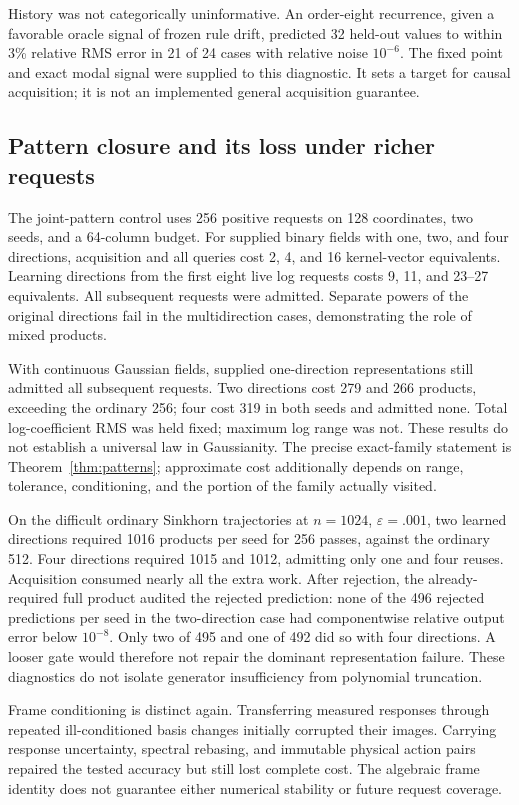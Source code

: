 \documentclass[journal]{IEEEtran}
\theoremstyle{definition}
\begin{document}
History was not categorically uninformative. An order-eight recurrence,
given a favorable oracle signal of frozen rule drift, predicted 32 held-out
values to within 3\% relative RMS error in 21 of 24 cases with relative
noise $10^{-6}$. The fixed point and exact modal signal were supplied to
this diagnostic. It sets a target for causal acquisition; it is not an
implemented general acquisition guarantee.

\subsection{Pattern closure and its loss under richer requests}
The joint-pattern control uses 256 positive requests on 128 coordinates,
two seeds, and a 64-column budget. For supplied binary fields with one,
two, and four directions, acquisition and all queries cost 2, 4, and 16
kernel-vector equivalents. Learning directions from the first eight live
log requests costs 9, 11, and 23--27 equivalents. All subsequent requests
were admitted. Separate powers of the original directions fail in the
multidirection cases, demonstrating the role of mixed products.

With continuous Gaussian fields, supplied one-direction representations
still admitted all subsequent requests. Two directions cost 279 and 266
products, exceeding the ordinary 256; four cost 319 in both seeds and
admitted none. Total log-coefficient RMS was held fixed; maximum log range
was not. These results do not establish a universal law in Gaussianity.
The precise exact-family statement is Theorem~\ref{thm:patterns};
approximate cost additionally depends on range, tolerance, conditioning,
and the portion of the family actually visited.

On the difficult ordinary Sinkhorn trajectories at $n=1024$,
$\varepsilon=.001$, two learned directions required 1016 products per
seed for 256 passes, against the ordinary 512. Four directions required
1015 and 1012, admitting only one and four reuses. Acquisition consumed
nearly all the extra work. After rejection, the already-required full
product audited the rejected prediction: none of the 496 rejected
predictions per seed in the two-direction case had componentwise relative
output error below $10^{-8}$. Only two of 495 and one of 492 did so with
four directions. A looser gate would therefore not repair the dominant
representation failure. These diagnostics do not isolate generator
insufficiency from polynomial truncation.

Frame conditioning is distinct again. Transferring measured responses
through repeated ill-conditioned basis changes initially corrupted their
images. Carrying response uncertainty, spectral rebasing, and immutable
physical action pairs repaired the tested accuracy but still lost complete
cost. The algebraic frame identity does not guarantee either numerical
stability or future request coverage.
\end{document}
